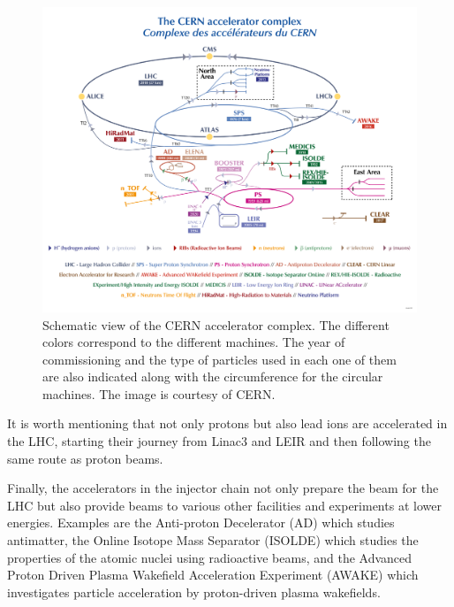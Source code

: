 \begin{figure}[!h] %
    \centering         
    \includegraphics[width=1\textwidth]{images/introduction/cern_accelerator_complex.png}
        \caption{Schematic view of the CERN accelerator complex. The different colors correspond to the different machines. The year of commissioning and the type of particles used in each one of them are also indicated along with the circumference for the circular machines. The image is courtesy of CERN.}
        \label{fig:cern_accelerator_complex}
 \end{figure}

 It is worth mentioning that not only protons but also lead ions are accelerated in the LHC, starting their journey from Linac3 and LEIR and then following the same route as proton beams.


 Finally, the accelerators in the injector chain not only prepare the beam for the LHC but also provide beams to various other facilities and experiments at lower energies. Examples are the Anti-proton Decelerator (AD) which studies antimatter, the Online Isotope Mass Separator (ISOLDE) which studies the properties of the atomic nuclei using radioactive beams, and the Advanced Proton Driven Plasma Wakefield Acceleration Experiment (AWAKE) which investigates particle acceleration by proton-driven plasma wakefields.

